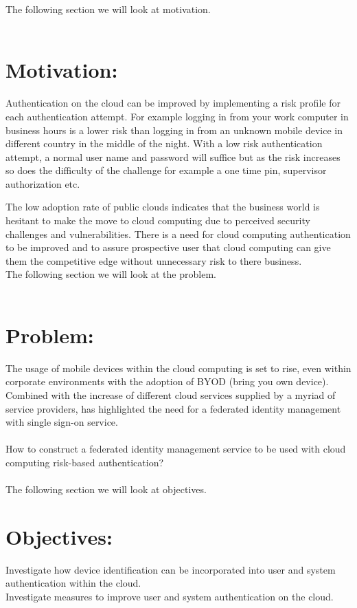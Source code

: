 \documentclass[11pt]{article}
\begin{document}
The following section we will look at motivation.
\\ \\

\section{Motivation:}
Authentication on the cloud can be improved by implementing a risk profile for each authentication attempt. For example logging in from your work computer in business hours is a lower risk than logging in from an unknown mobile device in different country in the middle of the night. With a low risk authentication attempt, a normal user name and password will suffice but as the risk increases so does the difficulty of the challenge for example a one time pin, supervisor authorization etc.

The low adoption rate of public clouds indicates that the business world is hesitant to make the move to cloud computing due to perceived security challenges and vulnerabilities. There is a need for cloud computing authentication to be improved and to assure prospective user that cloud computing can give them the competitive edge without unnecessary risk to there business. \\
The following section we will look at the problem. 
\\ \\


\section{Problem:}
The usage of mobile devices within the cloud computing is set to rise, even within corporate environments with the adoption of BYOD (bring you own device). Combined with the increase of different cloud services supplied by a myriad of service providers, has highlighted the need for a federated identity management with single sign-on service.  \\ \\ 
How to construct a federated identity management service to be used with cloud computing risk-based authentication? \\ \\
The following section we will look at objectives.

\section{Objectives:}
Investigate how device identification can be incorporated into user and system authentication within the cloud. \\
Investigate measures to improve user and system authentication on the
cloud.
\end{document}
